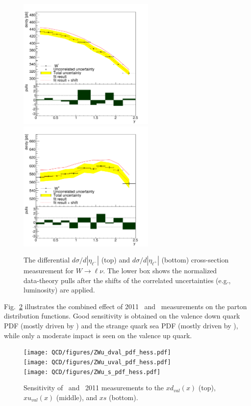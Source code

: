 \begin{figure}
  \begin{center}
    \includegraphics[width=0.60\textwidth]{res/fig/pulls_104}
    \includegraphics[width=0.60\textwidth]{res/fig/pulls_105}
  \end{center}
  \caption{ The differential $d\sigma/d|\eta_{\ell^{-}}|$ (top) and $d\sigma/d|\eta_{\ell^{+}}|$ (bottom) cross-section measurement for $W \rightarrow \ell\nu$. The lower box shows the normalized data-theory pulls after the shifts of the correlated uncertainties (e.g., luminosity) are applied. }
  \label{fig:QCDFit:Wpm}
\end{figure}

Fig.~\ref{fig:ZW_PDF_sensitivity} illustrates the combined effect of 2011 \Wpmln\ and \Zll\ measurements on the parton distribution functions. Good sensitivity is obtained on the valence down quark PDF (mostly driven by \Wpmln) and the strange quark sea PDF (mostly driven by \Zll), while only a moderate impact is seen on the valence up quark.

\begin{figure}
\begin{center}
\texttt{[image: QCD/figures/ZWu\_dval\_pdf\_hess.pdf]} \\
\texttt{[image: QCD/figures/ZWu\_uval\_pdf\_hess.pdf]} \\
\texttt{[image: QCD/figures/ZWu\_s\_pdf\_hess.pdf]}
\caption{Sensitivity of \Wpmln\ and \Zll\ 2011 measurements to the $xd_{val}(x)$ (top), $xu_{val}(x)$ (middle), and $xs$ (bottom). }
\label{fig:ZW_PDF_sensitivity}
\end{center}
\end{figure}

